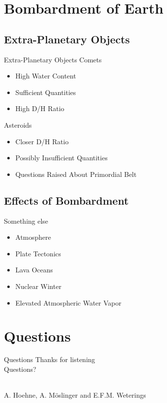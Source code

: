 \documentclass[11pt, aspectratio=169]{beamer}
\begin{document}
\section{Bombardment of Earth}
\subsection{Extra-Planetary Objects}
\begin{frame}[t]{Extra-Planetary Objects}
Comets
\begin{itemize}
	\item High Water Content
	\item Sufficient Quantities
	\item High D/H Ratio
\end{itemize}

Asteroids
\begin{itemize}
	\item Closer D/H Ratio
	\item Possibly Insufficient Quantities
	\item Questions Raised About Primordial Belt
\end{itemize}
\end{frame}


\subsection{Effects of Bombardment}
\begin{frame}[t]{Something else}
\begin{itemize}
	\item Atmosphere
	\item Plate Tectonics
	\item Lava Oceans
	\item Nuclear Winter
	\item Elevated Atmospheric Water Vapor
\end{itemize}
	
	
\end{frame}



\section{Questions}
\begin{frame}{Questions}
\centering
\Huge Thanks for listening\\

\huge Questions?\\\

\large A. Hoehne, A. M\"{o}slinger and E.F.M. Weterings\\

\end{frame}
\end{document}
